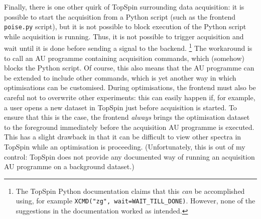 Finally, there is one other quirk of TopSpin surrounding data acquisition: it is possible to start the acquisition from a Python script (such as the frontend \texttt{poise.py} script), but it is not possible to block execution of the Python script while acquisition is running.
Thus, it is not possible to trigger acquisition and wait until it is done before sending a signal to the backend.%
\footnote{The TopSpin Python documentation claims that this \textit{can} be accomplished using, for example \texttt{XCMD("zg", wait=WAIT\_TILL\_DONE)}. However, none of the suggestions in the documentation worked as intended.}
The workaround is to call an AU programme containing acquisition commands, which (somehow) blocks the Python script.
Of course, this also means that the AU programme can be extended to include other commands, which is yet another way in which optimisations can be customised.
During optimisations, the frontend must also be careful not to overwrite other experiments: this can easily happen if, for example, a user opens a new dataset in TopSpin just before acquisition is started.
To ensure that this is the case, the frontend \textit{always} brings the optimisation dataset to the foreground immediately before the acquisition AU programme is executed.
This has a slight drawback in that it can be difficult to view other spectra in TopSpin while an optimisation is proceeding.
(Unfortunately, this is out of my control: TopSpin does not provide any documented way of running an acquisition AU programme on a background dataset.)
